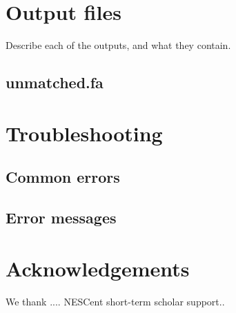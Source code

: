 \documentclass[12pt,letterpaper]{article}
\begin{document}
\bigskip\section{Output files}
Describe each of the outputs, and what they contain.

\subsection{unmatched.fa}

\bigskip\section{Troubleshooting}
\subsection{Common errors}
\subsection{Error messages}


\bigskip\section{Acknowledgements}
We thank .... NESCent short-term scholar support.. 

%
%
%
%
%
%
%





\end{document}
